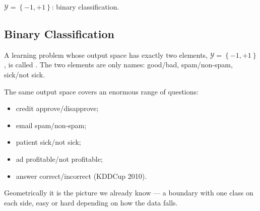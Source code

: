 \begin{moral}
    \(\mathcal{Y} = \left\{ -1, +1 \right\}\): binary classification.
\end{moral}

\subsection{Binary Classification}

\begin{definition}\label{def:binary}
    A learning problem whose output space has exactly two elements,
    \(\mathcal{Y} = \left\{ -1, +1 \right\}\), is called . The two elements are only names: good/bad, spam/non-spam,
    sick/not sick.
\end{definition}

The same output space covers an enormous range of questions:

\begin{itemize}
    \item credit approve/disapprove;
    \item email spam/non-spam;
    \item patient sick/not sick;
    \item ad profitable/not profitable;
    \item answer correct/incorrect (KDDCup 2010).
\end{itemize}

Geometrically it is the picture we already know --- a boundary with one class on
each side, easy or hard depending on how the data falls.


